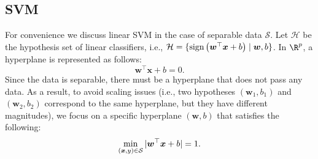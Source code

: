     \subsection{SVM}
        For convenience we discuss linear SVM in the case of separable data $\mathcal{S}$.
        Let $\mathcal{H}$ be the hypothesis set of linear classifiers, i.e., $\mathcal{H}=\{ \text{sign}\left(\bm{w}^\top \bm{x} + b \right) \mid \bm{w}, b \}$.
        In $\R^\nfeat$, a hyperplane is represented as follows:
            \begin{equation}
                \bm{w}^\top \bm{x} + b = 0.
            \end{equation}
        Since the data is separable, there must be a hyperplane that does not pass any data.
        As a result, to avoid scaling issues (i.e., two hypotheses $(\bm{w}_1, b_1)$ and $(\bm{w}_2, b_2)$ correspond to the same hyperplane, but they have different magnitudes), we focus on a specific hyperplane $(\bm{w}, b)$ that satisfies the following:
            \begin{equation}
                \min_{(\bm{x}, y) \in \mathcal{S}} | \bm{w}^\top \bm{x} + b | = 1.
            \end{equation}
        
